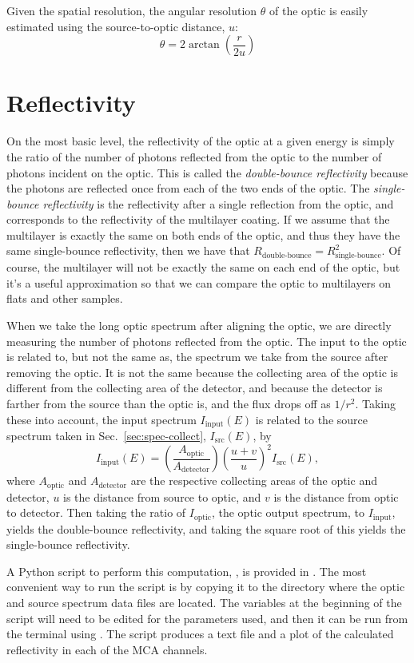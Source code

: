 Given the spatial resolution, the angular resolution $\theta$ of the optic is
easily estimated using the source-to-optic distance, $u$:
\begin{equation}
  \label{eq:ang_res}
  \theta = 2 \arctan{ \left( \frac{r}{2u} \right) }
\end{equation}

\section{Reflectivity}

On the most basic level, the reflectivity of the optic at a given energy is
simply the ratio of the number of photons reflected from the optic to the number
of photons incident on the optic. This is called the \textit{double-bounce
  reflectivity} because the photons are reflected once from each of the two ends
of the optic. The \textit{single-bounce reflectivity} is the reflectivity after
a single reflection from the optic, and corresponds to the reflectivity of the
multilayer coating. If we assume that the multilayer is exactly the same on both
ends of the optic, and thus they have the same single-bounce reflectivity, then
we have that $R_\text{double-bounce} = R_\text{single-bounce}^2$. Of course, the
multilayer will not be exactly the same on each end of the optic, but it's a
useful approximation so that we can compare the optic to multilayers on flats
and other samples.

When we take the long optic spectrum after aligning the optic, we are directly
measuring the number of photons reflected from the optic. The input to the optic
is related to, but not the same as, the spectrum we take from the source after
removing the optic. It is not the same because the collecting area of the optic
is different from the collecting area of the detector, and because the detector
is farther from the source than the optic is, and the flux drops off as
$1/r^2$. Taking these into account, the input spectrum $I_\text{input}(E)$ is
related to the source spectrum taken in Sec.~\ref{sec:spec-collect},
$I_\text{src}(E)$, by
\begin{equation}
  \label{eq:src-2-input}
  I_\text{input}(E) = \left( \frac{ A_\text{optic} }{ A_\text{detector} }
  \right) \left( \frac{ u+v }{ u } \right)^2 I_\text{src}(E),
\end{equation}
where $A_\text{optic}$ and $A_\text{detector}$ are the respective collecting
areas of the optic and detector, $u$ is the distance from source to optic, and
$v$ is the distance from optic to detector. Then taking the ratio of
$I_\text{optic}$, the optic output spectrum, to $I_\text{input}$, yields the
double-bounce reflectivity, and taking the square root of this yields the
single-bounce reflectivity.

A Python script to perform this computation, , is provided
in . The most convenient way to run the script is by
copying it to the directory where the optic and source spectrum data files are
located. The variables at the beginning of the script will need to be edited for
the parameters used, and then it can be run from the terminal using
. The script produces a text file and a plot of the
calculated reflectivity in each of the MCA channels.
